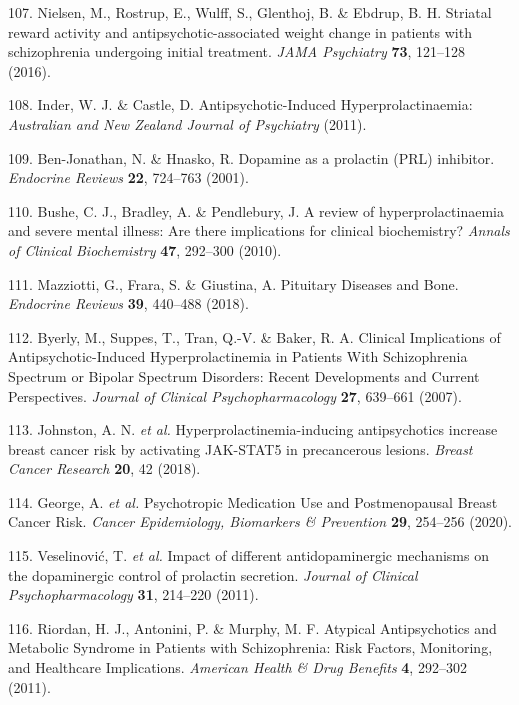 \documentclass[9pt,english,,jou,floatsintext]{apa6}
\begin{document}
\hypertarget{ref-Nielsen2016}{}
107. Nielsen, M., Rostrup, E., Wulff, S., Glenthoj, B. \& Ebdrup, B. H.
Striatal reward activity and antipsychotic-associated weight change in
patients with schizophrenia undergoing initial treatment. \emph{JAMA
Psychiatry} \textbf{73}, 121--128 (2016).

\hypertarget{ref-Inder2011}{}
108. Inder, W. J. \& Castle, D. Antipsychotic-Induced
Hyperprolactinaemia: \emph{Australian and New Zealand Journal of
Psychiatry} (2011).

\hypertarget{ref-BenJonathan2001}{}
109. Ben-Jonathan, N. \& Hnasko, R. Dopamine as a prolactin (PRL)
inhibitor. \emph{Endocrine Reviews} \textbf{22}, 724--763 (2001).

\hypertarget{ref-Bushe2010}{}
110. Bushe, C. J., Bradley, A. \& Pendlebury, J. A review of
hyperprolactinaemia and severe mental illness: Are there implications
for clinical biochemistry? \emph{Annals of Clinical Biochemistry}
\textbf{47}, 292--300 (2010).

\hypertarget{ref-Mazziotti2018}{}
111. Mazziotti, G., Frara, S. \& Giustina, A. Pituitary Diseases and
Bone. \emph{Endocrine Reviews} \textbf{39}, 440--488 (2018).

\hypertarget{ref-Byerly2007}{}
112. Byerly, M., Suppes, T., Tran, Q.-V. \& Baker, R. A. Clinical
Implications of Antipsychotic-Induced Hyperprolactinemia in Patients
With Schizophrenia Spectrum or Bipolar Spectrum Disorders: Recent
Developments and Current Perspectives. \emph{Journal of Clinical
Psychopharmacology} \textbf{27}, 639--661 (2007).

\hypertarget{ref-Johnston2018}{}
113. Johnston, A. N. \emph{et al.} Hyperprolactinemia-inducing
antipsychotics increase breast cancer risk by activating JAK-STAT5 in
precancerous lesions. \emph{Breast Cancer Research} \textbf{20}, 42
(2018).

\hypertarget{ref-George2020}{}
114. George, A. \emph{et al.} Psychotropic Medication Use and
Postmenopausal Breast Cancer Risk. \emph{Cancer Epidemiology, Biomarkers
\& Prevention} \textbf{29}, 254--256 (2020).

\hypertarget{ref-Veselinovic2011}{}
115. Veselinović, T. \emph{et al.} Impact of different antidopaminergic
mechanisms on the dopaminergic control of prolactin secretion.
\emph{Journal of Clinical Psychopharmacology} \textbf{31}, 214--220
(2011).

\hypertarget{ref-Riordan2011}{}
116. Riordan, H. J., Antonini, P. \& Murphy, M. F. Atypical
Antipsychotics and Metabolic Syndrome in Patients with Schizophrenia:
Risk Factors, Monitoring, and Healthcare Implications. \emph{American
Health \& Drug Benefits} \textbf{4}, 292--302 (2011).
\end{document}
